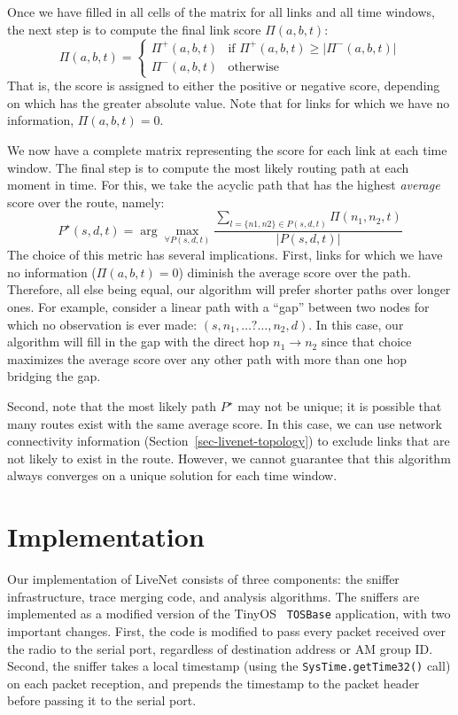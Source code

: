 Once we have filled in all cells of the matrix for all links and all
time windows, the next step is to compute the final link score 
$\Pi(a,b,t)$:
\[
\Pi(a,b,t) = \left\{ \begin{array}{ll}
  \Pi^+(a,b,t) & \mbox{if $\Pi^+(a,b,t) \geq |\Pi^-(a,b,t)|$} \\
  \Pi^-(a,b,t) & \mbox{otherwise}
  \end{array}\right. 
\]
That is, the score is assigned to either the positive or negative
score, depending on which has the greater absolute value. Note that
for links for which we have no information, $\Pi(a,b,t) = 0$. 

We now have a complete matrix representing the score for each link at
each time window. The final step is to compute the most likely routing
path at each moment in time. For this, we take the acyclic path that has the
highest {\em average} score over the route, namely:
\[
P^\star(s,d,t) = \arg\max_{\forall P(s,d,t)} 
\frac{\sum_{l=\{n1,n2\} \in P(s,d,t)} \Pi(n_1, n_2, t)}{| P(s,d,t) |}
\]
The choice of this metric has several implications. First, links
for which we have no information ($\Pi(a,b,t) = 0$) diminish the
average score over the path. Therefore, all else being equal, 
our algorithm will prefer shorter paths over longer ones. 
For example, consider a linear path with a ``gap'' between two nodes 
for which no observation is ever made: $(s, n_1, \ldots ? \ldots, n_2, d)$. 
In this case, our algorithm will fill in the gap with the direct hop 
$n_1 \rightarrow n_2$ since that choice maximizes the average score
over any other path with more than one hop bridging the gap.

Second, note that the most likely path $P^\star$ may not be unique; 
it is possible that many routes exist with the same average score.
In this case, we can use network connectivity information 
(Section~\ref{sec-livenet-topology}) to exclude links that are not likely to
exist in the route. However, we cannot guarantee that this algorithm
always converges on a unique solution for each time window.
 


\section{Implementation}
\label{sec-livenet-impl}


Our implementation of LiveNet consists of three components: the sniffer
infrastructure, trace merging code, and analysis algorithms. The
sniffers are implemented as a modified version of the TinyOS {\tt
TOSBase} application, with two important changes. First, the code is
modified to pass every packet received over the radio to the serial
port, regardless of destination address or AM group ID. 
Second, the sniffer takes a local timestamp (using the 
{\tt SysTime.getTime32()} call) on each packet reception, and prepends 
the timestamp to the packet header before passing it to the serial port. 



